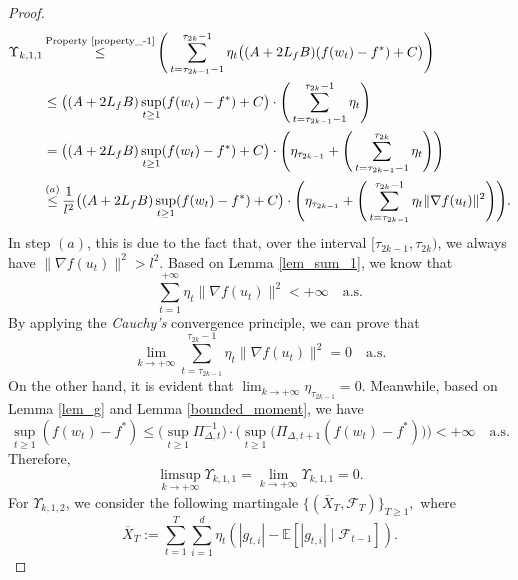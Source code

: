 \documentclass{article} %
\begin{document}
\begin{proof}
\begin{align*}
\Upsilon_{k,1,1}&\mathop{\le}^{\text{Property \ref{property_-1}}} \Bigg(
\sum_{t=\tau_{2k-1}-1}^{\tau_{2k}-1}\eta_{t}\big((A+2L_{f}B)(f(w_{t})-f^{*})+C\big)\Bigg)\\&\le \big((A+2L_{f}B)\sup_{t\ge 1}(f(w_{t})-f^{*})+C\big)\cdot\Bigg(
\sum_{t=\tau_{2k-1}-1}^{\tau_{2k}-1}\eta_{t}\Bigg)\\&=\big((A+2L_{f}B)\sup_{t\ge 1}(f(w_{t})-f^{*})+C\big)\cdot\Bigg(\eta_{\tau_{2k-1}}+\Bigg(
\sum_{t=\tau_{2k-1}-1}^{\tau_{2k}}\eta_{t}\Bigg)\Bigg)\\&\mathop{\le}^{(a)}\frac{1}{l^{2}}\big((A+2L_{f}B)\sup_{t\ge 1}(f(w_{t})-f^{*})+C\big)\cdot\Bigg(\eta_{\tau_{2k-1}}+\Bigg(
\sum_{t=\tau_{2k-1}}^{\tau_{2k}-1}\eta_{t}\|\nabla f(u_{t})\|^{2}\Bigg)\Bigg).
\end{align*}
In step $(a)$, this is due to the fact that, over the interval $[\tau_{2k-1}, \tau_{2k})$, we always have $\|\nabla f(u_{t})\|^{2} > l^{2}$. Based on Lemma \ref{lem_sum_1}, we know that
\[\sum_{t=1}^{+\infty}\eta_{t}\|\nabla f(u_{t})\|^{2} < +\infty \quad \text{a.s.}\]
By applying the \emph{Cauchy's} convergence principle, we can prove that
\[\lim_{k\rightarrow+\infty} \sum_{t=\tau_{2k-1}}^{\tau_{2k}-1}\eta_{t}\|\nabla f(u_{t})\|^{2}= 0 \quad \text{a.s.}\]
On the other hand, it is evident that $\lim_{k\rightarrow+\infty}{\eta_{\tau_{2k-1}}}= 0.$ 
Meanwhile, based on Lemma \ref{lem_g} and Lemma \ref{bounded_moment}, we have
\[\sup_{t \geq 1} (f(w_{t}) - f^*) \leq \Big( \sup_{t \geq 1} \Pi_{\Delta,t}^{-1} \Big) \cdot \Big( \sup_{t \geq 1} \big(\Pi_{\Delta,t+1} (f(w_{t}) - f^*) \big)\Big) < +\infty \quad \text{a.s.}\]
Therefore, 
\[\limsup_{k \to +\infty} \Upsilon_{k,1,1} = \lim_{k \to +\infty} \Upsilon_{k,1,1} = 0.\]
For $\Upsilon_{k,1,2}$, we consider the following martingale $\{(\overline{X}_{T},\mathscr{F}_{T})\}_{T\ge 1},$ where 
\[\overline{X}_{T}:=\sum_{t=1}^{T} \sum_{i=1}^{d} \eta_{t} (|g_{t,i}| - \mathbb{E}[|g_{t,i}| \mid \mathscr{F}_{t-1}]).\]

\end{proof}
\end{document}

